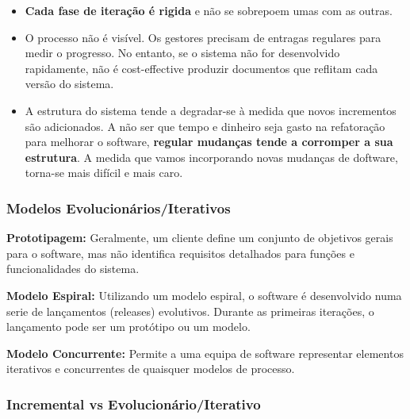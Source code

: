 \documentclass{article}
\begin{document}
\begin{itemize}
  \item \textbf{Cada fase de iteração é rigida} e não se sobrepoem
  umas com as outras.

  \item O processo não é visível. Os gestores precisam  de entragas regulares
  para medir o progresso. No entanto, se o sistema não for desenvolvido rapidamente,
  não é cost-effective produzir documentos que reflitam cada versão do sistema.

  \item A estrutura do sistema tende a degradar-se à medida que novos
  incrementos são adicionados. A não ser que tempo e dinheiro seja
  gasto na refatoração para melhorar o software,
  \textbf{regular mudanças tende a corromper a sua estrutura}.
  A medida que vamos incorporando novas mudanças de doftware,
  torna-se mais difícil e mais caro.
\end{itemize}

\pagebreak

\subsubsection{Modelos Evolucionários/Iterativos}

\begin{flushleft}
  \textbf{Prototipagem:} Geralmente, um cliente define um conjunto
  de objetivos gerais para o software, mas não identifica requisitos
  detalhados para funções e funcionalidades do sistema.

  \vspace{2mm}

  \textbf{Modelo Espiral:} Utilizando um modelo espiral, o software é desenvolvido
  numa serie de lançamentos (releases) evolutivos. Durante as primeiras iterações,
  o lançamento pode ser um protótipo ou um modelo.

  \vspace{2mm}

  \textbf{Modelo Concurrente:} Permite a uma equipa de software representar
  elementos iterativos e concurrentes de quaisquer modelos de processo.
\end{flushleft}

\subsubsection{Incremental vs Evolucionário/Iterativo}
\end{document}
